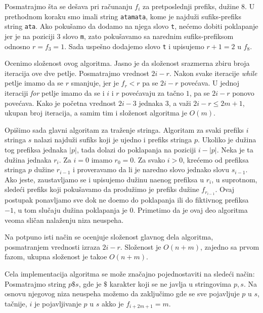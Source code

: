 Posmatrajmo \v sta se de\v sava pri ra\v cunanju $f_i$ za pretposlednji prefiks, du\v zine $8$. U prethodnom koraku smo imali string \texttt{atamata}, kome je najdu\v zi sufiks-prefiks string \texttt{ata}. Ako poku\v samo da dodamo na njega slovo \texttt{t}, ne\' cemo dobiti poklapanje jer je na poziciji $3$ slovo \texttt{m}, zato poku\v savamo sa narednim sufiks-prefiksom odnosno $r = f_3 = 1$. Sada uspe\v sno dodajemo slovo \texttt{t} i upisujemo $r+1 = 2$ u $f_8$.



Ocenimo slo\v zenost ovog algoritma. Jasno je da slo\v zenost srazmerna zbiru broja iteracija ove dve petlje. Posmatrajmo vrednost $2i-r$. Nakon svake iteracije \textit{while} petlje imamo da se $r$ smanjuje, jer je $f_r < r$ pa se $2i-r$ pove\' cava. U jednoj iteraciji \textit{for} petlje imamo da se i $i$ i $r$ pove\' cavaju za ta\v cno $1$, pa se $2i-r$ ponovo pove\' cava. Kako je po\v cetna vrednost $2i-3$ jednaka $3$, a va\v zi $2i-r \leq 2m+1$, ukupan broj iteracija, a samim tim i slo\v zenost algoritma je $O(m)$.

Opi\v simo sada glavni algoritam za tra\v zenje stringa. Algoritam za svaki prefiks $i$ stringa $s$ nalazi najdu\v zi sufiks koji je ujedno i prefiks stringa $p$. Ukoliko je du\v zina tog prefiksa jednaka $|p|$, tada dolazi do poklapanja na poziciji $i-|p|$. Neka je ta du\v zina jednaka $r_i$. Za $i=0$ imamo $r_0 = 0$. Za svako $i>0$, kre\' cemo od prefiksa stringa $p$ du\v zine $r_{i-1}$ i proveravamo da li je naredno slovo jednako slovu $s_{i-1}$. Ako jeste, zaustavljamo se i upisujemo du\v zinu na\dj enog prefiksa u $r_i$, u suprotnom, slede\' ci prefiks koji poku\v savamo da produ\v zimo je prefiks du\v zine $f_{r_{i-1}}$. Ovaj postupak ponavljamo sve dok ne do\dj emo do poklapanja ili do fiktivnog prefiksa $-1$, u tom slu\v caju du\v zina poklapanja je $0$. Primetimo da je ovaj deo algoritma veoma sli\v can nala\v zenju niza neuspeha.



Na potpuno isti na\v cin se ocenjuje slo\v zenost glavnog dela algoritma, posmatranjem vrednosti izraza $2i-r$. Slo\v zenost je $O(n+m)$, zajedno sa prvom fazom, ukupna slo\v zenost je tako\dj e $O(n+m)$.

Cela implementacija algoritma se mo\v ze zna\v cajno pojednostaviti na slede\' ci na\v cin: Posmatrajmo string $p\$s$, gde je $\$$ karakter koji se ne javlja u stringovima $p,s$. Na osnovu njegovog niza neuspeha mo\v zemo da zaklju\v cimo gde se sve pojavljuje $p$ u $s$, ta\v cnije, $i$ je pojavljivanje $p$ u $s$ akko je $f_{i+2m+1} = m$.

